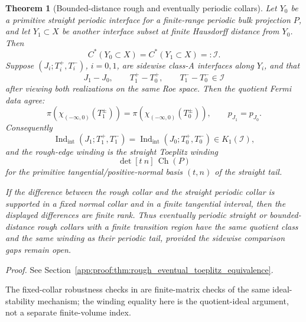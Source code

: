 \documentclass[11pt]{article}
\numberwithin{equation}{section}
\newtheorem{theorem}{Theorem}[section]
\theoremstyle{definition}
\theoremstyle{remark}
\newcommand{\proofref}[1]{%
  \par\noindent\emph{Proof.} See Section~\ref{#1}.\par\medskip
}
\newcommand{\proofappendixref}[1]{\proofref{#1}}
\newcommand{\Indint}{\operatorname{Ind}_{\mathrm{int}}}
\newcommand{\Ch}{\operatorname{Ch}}
\begin{document}
\begin{theorem}[Bounded-distance rough and eventually periodic collars]\label{thm:rough_eventual_toeplitz_equivalence}
Let \(Y_0\) be a primitive straight periodic interface for a finite-range periodic bulk projection
\(P\), and let \(Y_1\subset X\) be another interface subset at finite Hausdorff distance from
\(Y_0\). Then
\[
C^*(Y_0\subset X)=C^*(Y_1\subset X)=:\mathcal I.
\]
Suppose \((J_i;T_i^+,T_i^-)\), \(i=0,1\), are sidewise class-A interfaces along \(Y_i\), and that
\[
J_1-J_0,\qquad T_1^+-T_0^+,\qquad T_1^--T_0^-\in\mathcal I
\]
after viewing both realizations on the same Roe space. Then the quotient Fermi data agree:
\[
\pi(\chi_{(-\infty,0)}(T_1^\pm))
=
\pi(\chi_{(-\infty,0)}(T_0^\pm)),
\qquad
p_{J_1}=p_{J_0}.
\]
Consequently
\[
\Indint(J_1;T_1^+,T_1^-)=\Indint(J_0;T_0^+,T_0^-)\in K_1(\mathcal I),
\]
and the rough-edge winding is the straight Toeplitz winding
\[
\det[t\ n]\,\Ch(P)
\]
for the primitive tangential/positive-normal basis \((t,n)\) of the straight tail.

If the difference between the rough collar and the straight periodic collar is supported in a fixed
normal collar and in a finite tangential interval, then the displayed differences are finite rank.
Thus eventually periodic straight or bounded-distance rough collars with a finite transition region
have the same quotient class and the same winding as their periodic tail, provided the sidewise
comparison gaps remain open.
\end{theorem}
\proofappendixref{app:proof:thm:rough_eventual_toeplitz_equivalence}




The fixed-collar robustness checks in
 are finite-matrix checks of the
same ideal-stability mechanism; the winding equality here is the quotient-ideal argument, not a
separate finite-volume index.
\end{document}
